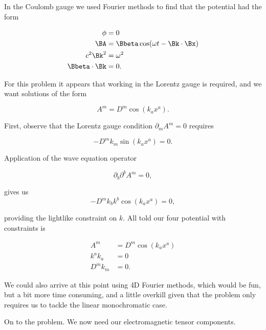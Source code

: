 In the Coulomb gauge we used Fourier methods to find that the potential had the form

\begin{align}\label{eqn:relElectroDynProblemSet6:30}
\phi &= 0 \\
\BA &= \Bbeta \cos(\omega t - \Bk \cdot \Bx) \\
c^2 \Bk^2 &= \omega^2 \\
\Bbeta \cdot \Bk &= 0.
\end{align}

For this problem it appears that working in the Lorentz gauge is required, and we want solutions of the form

\begin{equation}\label{eqn:relElectroDynProblemSet6:50}
A^m = D^m \cos( k_a x^a ).
\end{equation}

First, observe that the Lorentz gauge condition $\partial_m A^m = 0$ requires

\begin{equation}\label{eqn:relElectroDynProblemSet6:70}
-D^m k_m \sin( k_a x^a ) = 0.
\end{equation}

Application of the wave equation operator

\begin{equation}\label{eqn:relElectroDynProblemSet6:90}
\partial_b \partial^b A^m = 0,
\end{equation}

gives us
\begin{equation}\label{eqn:relElectroDynProblemSet6:110}
-D^m k_b k^b \cos( k_a x^a ) = 0,
\end{equation}

providing the lightlike constraint on $k$.  All told our four potential with constraints is

\begin{align}\label{eqn:relElectroDynProblemSet6:130}
A^m &= D^m \cos( k_a x^a ) \\
k^a k_a &= 0 \\
D^m k_m &= 0.
\end{align}

We could also arrive at this point using 4D Fourier methods, which would be fun, but a bit more time consuming, and a little overkill given that the problem only requires us to tackle the linear monochromatic case.

On to the problem.  We now need our electromagnetic tensor components.


